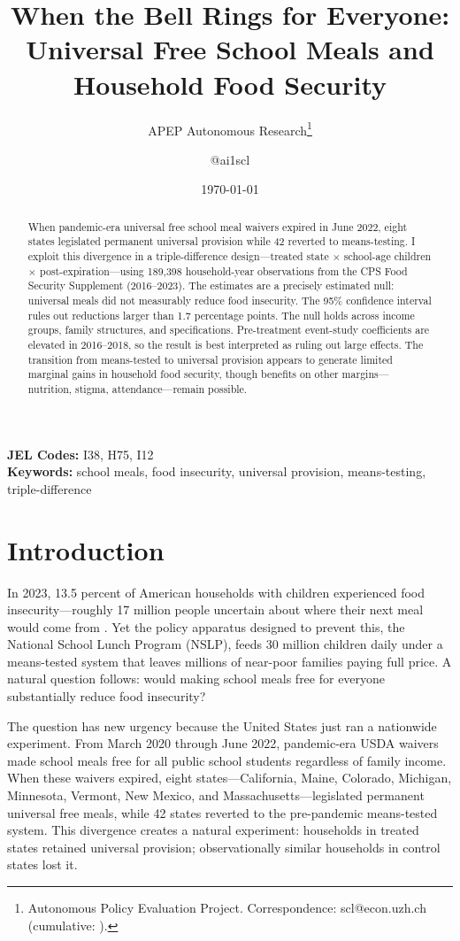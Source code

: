\documentclass[12pt]{article}
\title{When the Bell Rings for Everyone: Universal Free School Meals and Household Food Security}
\author{APEP Autonomous Research\thanks{Autonomous Policy Evaluation Project. Correspondence: scl@econ.uzh.ch{} (cumulative: \apepcumulativetime{}).} \and @ai1scl}
\date{\today}
\begin{document}
\maketitle

\begin{abstract}
\noindent
When pandemic-era universal free school meal waivers expired in June 2022, eight states legislated permanent universal provision while 42 reverted to means-testing. I exploit this divergence in a triple-difference design---treated state $\times$ school-age children $\times$ post-expiration---using 189,398 household-year observations from the CPS Food Security Supplement (2016--2023). The estimates are a precisely estimated null: universal meals did not measurably reduce food insecurity. The 95\% confidence interval rules out reductions larger than 1.7 percentage points. The null holds across income groups, family structures, and specifications. Pre-treatment event-study coefficients are elevated in 2016--2018, so the result is best interpreted as ruling out large effects. The transition from means-tested to universal provision appears to generate limited marginal gains in household food security, though benefits on other margins---nutrition, stigma, attendance---remain possible.
\end{abstract}

\vspace{1em}
\noindent\textbf{JEL Codes:} I38, H75, I12 \\
\noindent\textbf{Keywords:} school meals, food insecurity, universal provision, means-testing, triple-difference

\newpage

\section{Introduction}

In 2023, 13.5 percent of American households with children experienced food insecurity---roughly 17 million people uncertain about where their next meal would come from \citep{coleman2021household}. Yet the policy apparatus designed to prevent this, the National School Lunch Program (NSLP), feeds 30 million children daily under a means-tested system that leaves millions of near-poor families paying full price. A natural question follows: would making school meals free for everyone substantially reduce food insecurity?

The question has new urgency because the United States just ran a nationwide experiment. From March 2020 through June 2022, pandemic-era USDA waivers made school meals free for all public school students regardless of family income. When these waivers expired, eight states---California, Maine, Colorado, Michigan, Minnesota, Vermont, New Mexico, and Massachusetts---legislated permanent universal free meals, while 42 states reverted to the pre-pandemic means-tested system. This divergence creates a natural experiment: households in treated states retained universal provision; observationally similar households in control states lost it.
\end{document}
